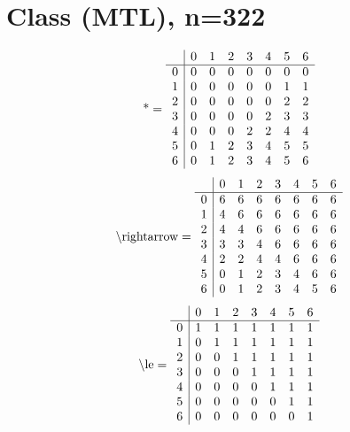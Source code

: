 \documentclass[11pt]{article}
\begin{document}
\section{Class (MTL), n=322}
\[\text{*} = 
\begin{array}{r | r r r r r r r}
 & 0 & 1 & 2 & 3 & 4 & 5 & 6 \\ \hline
0 & 0 & 0 & 0 & 0 & 0 & 0 & 0 \\
1 & 0 & 0 & 0 & 0 & 0 & 1 & 1 \\
2 & 0 & 0 & 0 & 0 & 0 & 2 & 2 \\
3 & 0 & 0 & 0 & 0 & 2 & 3 & 3 \\
4 & 0 & 0 & 0 & 2 & 2 & 4 & 4 \\
5 & 0 & 1 & 2 & 3 & 4 & 5 & 5 \\
6 & 0 & 1 & 2 & 3 & 4 & 5 & 6 \\
\end{array}
\]
\[\text{\textbackslash rightarrow} = 
\begin{array}{r | r r r r r r r}
 & 0 & 1 & 2 & 3 & 4 & 5 & 6 \\ \hline
0 & 6 & 6 & 6 & 6 & 6 & 6 & 6 \\
1 & 4 & 6 & 6 & 6 & 6 & 6 & 6 \\
2 & 4 & 4 & 6 & 6 & 6 & 6 & 6 \\
3 & 3 & 3 & 4 & 6 & 6 & 6 & 6 \\
4 & 2 & 2 & 4 & 4 & 6 & 6 & 6 \\
5 & 0 & 1 & 2 & 3 & 4 & 6 & 6 \\
6 & 0 & 1 & 2 & 3 & 4 & 5 & 6 \\
\end{array}
\]
\[\text{\textbackslash le} = 
\begin{array}{r | r r r r r r r}
 & 0 & 1 & 2 & 3 & 4 & 5 & 6 \\ \hline
0 & 1 & 1 & 1 & 1 & 1 & 1 & 1 \\
1 & 0 & 1 & 1 & 1 & 1 & 1 & 1 \\
2 & 0 & 0 & 1 & 1 & 1 & 1 & 1 \\
3 & 0 & 0 & 0 & 1 & 1 & 1 & 1 \\
4 & 0 & 0 & 0 & 0 & 1 & 1 & 1 \\
5 & 0 & 0 & 0 & 0 & 0 & 1 & 1 \\
6 & 0 & 0 & 0 & 0 & 0 & 0 & 1 \\
\end{array}
\]
\end{document}
